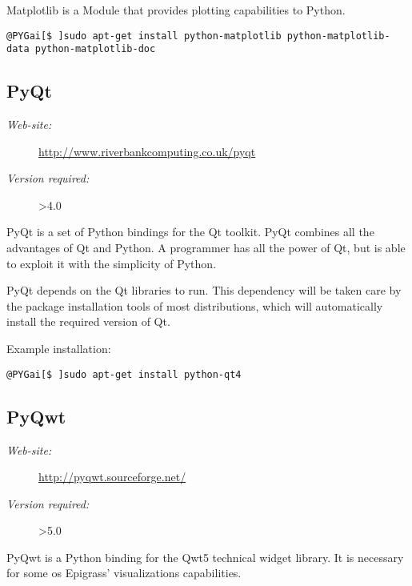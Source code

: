 \documentclass[a4paper,10pt]{manual}
\begin{document}
Matplotlib is a Module that provides plotting capabilities to Python.

\begin{Verbatim}[commandchars=@\[\]]
@PYGai[$ ]sudo apt-get install python-matplotlib python-matplotlib-data python-matplotlib-doc
\end{Verbatim}


\subsection{PyQt}
\begin{description}
\item[\emph{Web-site:}]
\href{http://www.riverbankcomputing.co.uk/pyqt}{http://www.riverbankcomputing.co.uk/pyqt}

\item[\emph{Version required:}]
\textgreater{}4.0

\end{description}

PyQt is a set of Python bindings for the Qt toolkit. PyQt combines all the advantages of Qt and Python. A programmer has all the power of Qt, but is able to exploit it with the simplicity of Python.

PyQt depends on the Qt libraries to run. This dependency will be taken care by the package installation tools of most distributions, which will automatically install the required version of Qt.

Example installation:

\begin{Verbatim}[commandchars=@\[\]]
@PYGai[$ ]sudo apt-get install python-qt4
\end{Verbatim}


\subsection{PyQwt}
\begin{description}
\item[\emph{Web-site:}]
\href{http://pyqwt.sourceforge.net/}{http://pyqwt.sourceforge.net/}

\item[\emph{Version required:}]
\textgreater{}5.0

\end{description}

PyQwt is a Python binding for the Qwt5 technical widget library. It is necessary for some os Epigrass' visualizations capabilities.
\end{document}
